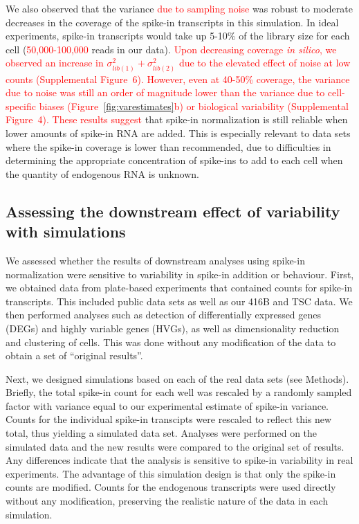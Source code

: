 \documentclass{article}
\newcommand{\suppfigcell}{4}
\newcommand{\suppfignoise}{6}
\newcommand{\revised}[1]{\textcolor{red}{#1}}
\begin{document}
We also observed that the variance \revised{due to sampling noise} was robust to moderate decreases in the coverage of the spike-in transcripts in this simulation.
In ideal experiments, spike-in transcripts would take up 5-10\% of the library size for each cell (\revised{50,000-100,000} reads in our data).
\revised{Upon decreasing coverage \textit{in silico}, we observed an increase in $\sigma^2_{lib(1)} + \sigma^2_{lib(2)}$ due to the elevated effect of noise at low counts (Supplemental Figure~\suppfignoise{}).
However, even at 40-50\% coverage, the variance due to noise was still an order of magnitude lower than the variance due to cell-specific biases (Figure~\ref{fig:varestimates}b) or biological variability (Supplemental Figure~\suppfigcell{}).
These results suggest} that spike-in normalization is still reliable when lower amounts of spike-in RNA are added.
This is especially relevant to data sets where the spike-in coverage is lower than recommended, due to difficulties in determining the appropriate concentration of spike-ins to add to each cell when the quantity of endogenous RNA is unknown.

\subsection*{Assessing the downstream effect of variability with simulations}
We assessed whether the results of downstream analyses using spike-in normalization were sensitive to variability in spike-in addition or behaviour.
First, we obtained data from plate-based experiments that contained counts for spike-in transcripts.
This included public data sets \autocite{segerstople2016single,islam2011characterization} as well as our 416B and TSC data.
We then performed analyses such as detection of differentially expressed genes (DEGs) and highly variable genes (HVGs), as well as dimensionality reduction and clustering of cells.
This was done without any modification of the data to obtain a set of ``original results''.

Next, we designed simulations based on each of the real data sets (see Methods).
Briefly, the total spike-in count for each well was rescaled by a randomly sampled factor with variance equal to our experimental estimate of spike-in variance.
Counts for the individual spike-in transcipts were rescaled to reflect this new total, thus yielding a simulated data set.
Analyses were performed on the simulated data and the new results were compared to the original set of results.
Any differences indicate that the analysis is sensitive to spike-in variability in real experiments.
The advantage of this simulation design is that only the spike-in counts are modified.
Counts for the endogenous transcripts were used directly without any modification, preserving the realistic nature of the data in each simulation.
\end{document}
